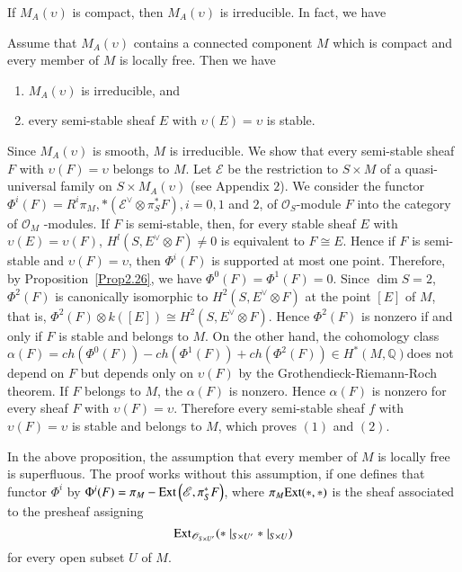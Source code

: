 If $M_A(\upsilon)$ is compact, then $M_A(\upsilon)$  is
irreducible. In fact, we have 

\begin{Prop}\label{Prop4.4}
Assume that $M_A(\upsilon)$ contains a connected component $M$ which
is compact and every member of $M$ is locally free. Then we have 
\begin{enumerate}
\renewcommand{\labelenumi}{(\theenumi)}
\item $M_A(\upsilon)$ is irreducible, and 
\item every semi-stable sheaf $E$ with $\upsilon(E)=\upsilon$ is
stable. 
\end{enumerate}
\end{Prop}

\begin{Proof}
Since $M_A(\upsilon)$ is smooth, $M$ is irreducible. We show that
every semi-stable sheaf $F$ with $\upsilon(F)=\upsilon$ belongs to
$M$. Let $\mathscr{E}$ be the restriction to $S\times M$ of a
quasi-universal family on $S\times M_A(\upsilon)$ (see Appendix
$2$). We consider the functor
$\Phi^{i}(F)=R^{i}\pi_{M},\ast\left(\mathscr{E}^{\vee}\otimes \pi_S^{\ast}F\right),
i=0,1$ and $2$, of $\mathscr{O}_S$-module $F$ into the category of
$\mathscr{O}_M$ -modules. If $F$ is semi-stable, then, for every
stable sheaf $E$ with $\upsilon(E)=\upsilon(F)$,
$H^{l}\left(S,E^{\vee}\otimes F\right)\neq 0$ is equivalent to $F\cong E$. Hence
if $F$ is semi-stable and $\upsilon(F)=\upsilon$, then $\Phi^{i}(F)$
is supported at most one point. Therefore, by
Proposition~\ref{Prop2.26}, we have $\Phi^{0}(F)=\Phi^{1}(F)=0$. Since
$\dim S=2$, $\Phi^{2}(F)$ is canonically isomorphic to
$H^{2}(S,E^{\vee}\otimes F)$ at the point $[E]$ of $M$, that is,
$\Phi^{2}(F)\otimes k([E])\cong H^{2}\left(S,E^{\vee}\otimes F\right)$. Hence
$\Phi^{2}(F)$ is nonzero if and only if $F$ is stable and belongs to
$M$. On the other hand, the cohomology class
$\alpha(F)=ch\left(\Phi^{0}(F)\right)-ch\left(\Phi^{1}(F)\right)+ch\left(\Phi^{2}(F)\right)
\in H^{\ast}(M,\mathbb{Q})$\pageoriginale does not depend on $F$ but depends only on
$\upsilon(F)$ by the Grothendieck-Riemann-Roch theorem. If $F$ belongs
to $M$, the $\alpha(F)$ is nonzero. Hence $\alpha(F)$ is nonzero for
every sheaf $F$ with $\upsilon(F)=\upsilon$. Therefore every
semi-stable sheaf $f$ with $\upsilon(F)=\upsilon$ is stable and
belongs to $M$, which proves $(1)$ and $(2)$.
\enprf
\end{Proof}

\begin{remark}\label{remark4.5}
In the above proposition, the assumption that every member of $M$ is
locally free is superfluous. The proof works without this assumption,
if one defines that functor $\Phi^{i}$ by
$\Phi^{i}(F)=\pi_M-\mathrm{Ext}\left(\mathscr{E},\pi^{\ast}_SF\right)$, where
$\pi_M \mathrm{Ext}(\ast,\ast)$  is the sheaf associated to the presheaf
assigning 
$$
\mathrm{Ext}_{\mathscr{O}_{S\times U'}}(\ast\mid_{S\times
U'}\ast\mid_{S\times U})
$$ 
for every open subset $U$ of $M$. 
\end{remark}


